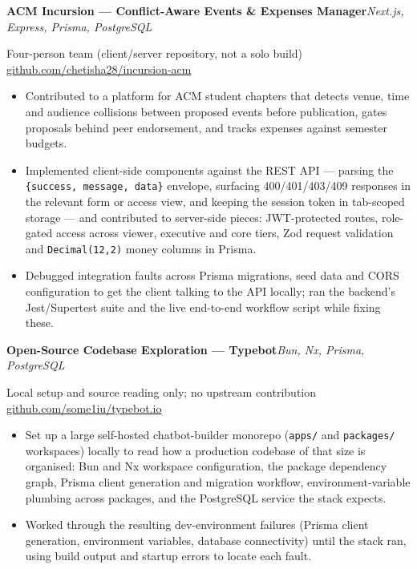 \documentclass[10pt,a4paper]{article}
\newcommand{\project}[2]{%
  \par{\textbf{#1}}\hfill{\itshape\color{black!65}#2}\par}
\newcommand{\meta}[1]{%
  \par{\color{black!65}#1}\par\vspace{1pt}}
\begin{document}
\vspace{3pt}
\project{ACM Incursion --- Conflict-Aware Events \& Expenses Manager}{Next.js, Express, Prisma, PostgreSQL}
\meta{Four-person team (client/server repository, not a solo build) \;\textbullet\;
      \href{https://github.com/chetisha28/incursion-acm}{github.com/chetisha28/incursion-acm}}
\begin{itemize}
  \item Contributed to a platform for ACM student chapters that detects venue, time and audience
        collisions between proposed events before publication, gates proposals behind peer endorsement,
        and tracks expenses against semester budgets.
  \item Implemented client-side components against the REST API --- parsing the
        \texttt{\{success, message, data\}} envelope, surfacing 400/401/403/409 responses in the
        relevant form or access view, and keeping the session token in tab-scoped storage --- and
        contributed to server-side pieces: JWT-protected routes, role-gated access across viewer,
        executive and core tiers, Zod request validation and \texttt{Decimal(12,2)} money columns in
        Prisma.
  \item Debugged integration faults across Prisma migrations, seed data and CORS configuration to get
        the client talking to the API locally; ran the backend's Jest/Supertest suite and the live
        end-to-end workflow script while fixing these.
\end{itemize}

\vspace{3pt}
\project{Open-Source Codebase Exploration --- Typebot}{Bun, Nx, Prisma, PostgreSQL}
\meta{Local setup and source reading only; no upstream contribution \;\textbullet\;
      \href{https://github.com/some1iu/typebot.io}{github.com/some1iu/typebot.io}}
\begin{itemize}
  \item Set up a large self-hosted chatbot-builder monorepo (\texttt{apps/} and \texttt{packages/}
        workspaces) locally to read how a production codebase of that size is organised: Bun and Nx
        workspace configuration, the package dependency graph, Prisma client generation and migration
        workflow, environment-variable plumbing across packages, and the PostgreSQL service the stack
        expects.
  \item Worked through the resulting dev-environment failures (Prisma client generation, environment
        variables, database connectivity) until the stack ran, using build output and startup errors to
        locate each fault.
\end{itemize}
\end{document}
